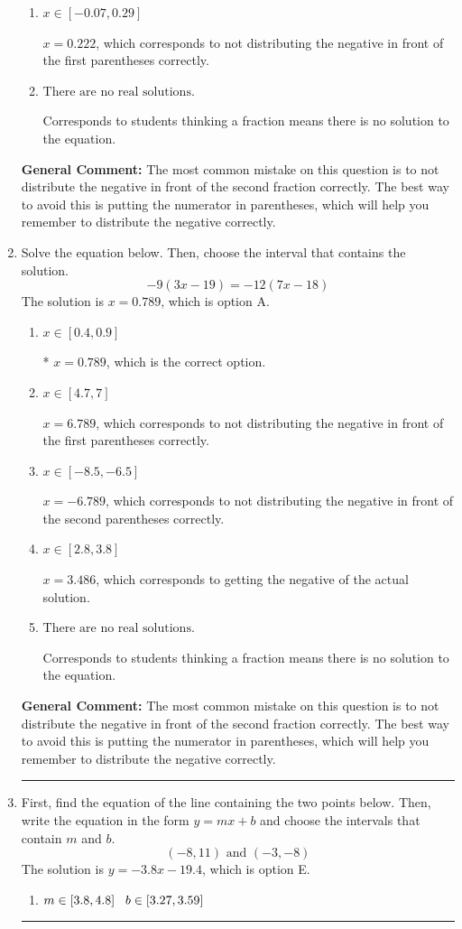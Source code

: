 \documentclass{extbook}[14pt]
\newcommand{\litem}[1]{\item #1

\rule{\textwidth}{0.4pt}}
\begin{document}
\begin{enumerate}
{\begin{enumerate}[label=\Alph*.]
$x = -0.637$, which corresponds to getting the negative of the actual solution.
\item \( x \in [-0.07, 0.29] \)

$x = 0.222$, which corresponds to not distributing the negative in front of the first parentheses correctly.
\item \( \text{There are no real solutions.} \)

Corresponds to students thinking a fraction means there is no solution to the equation.
\end{enumerate}

\textbf{General Comment:} The most common mistake on this question is to not distribute the negative in front of the second fraction correctly. The best way to avoid this is putting the numerator in parentheses, which will help you remember to distribute the negative correctly.
}
\litem{
Solve the equation below. Then, choose the interval that contains the solution.
\[ -9(3x -19) = -12(7x -18) \]The solution is \( x = 0.789 \), which is option A.\begin{enumerate}[label=\Alph*.]
\item \( x \in [0.4, 0.9] \)

* $x = 0.789$, which is the correct option.
\item \( x \in [4.7, 7] \)

$x = 6.789$, which corresponds to not distributing the negative in front of the first parentheses correctly.
\item \( x \in [-8.5, -6.5] \)

$x = -6.789$, which corresponds to not distributing the negative in front of the second parentheses correctly.
\item \( x \in [2.8, 3.8] \)

$x = 3.486$, which corresponds to getting the negative of the actual solution.
\item \( \text{There are no real solutions.} \)

Corresponds to students thinking a fraction means there is no solution to the equation.
\end{enumerate}

\textbf{General Comment:} The most common mistake on this question is to not distribute the negative in front of the second fraction correctly. The best way to avoid this is putting the numerator in parentheses, which will help you remember to distribute the negative correctly.
}
\litem{
First, find the equation of the line containing the two points below. Then, write the equation in the form $ y=mx+b $ and choose the intervals that contain $m$ and $b$.
\[ (-8, 11) \text{ and } (-3, -8) \]The solution is \( y = -3.8x -19.4 \), which is option E.\begin{enumerate}[label=\Alph*.]
\item \( m \in [3.8, 4.8] \hspace*{3mm} b \in [3.27, 3.59] \)


\end{enumerate}}
\end{enumerate}
\end{document}
